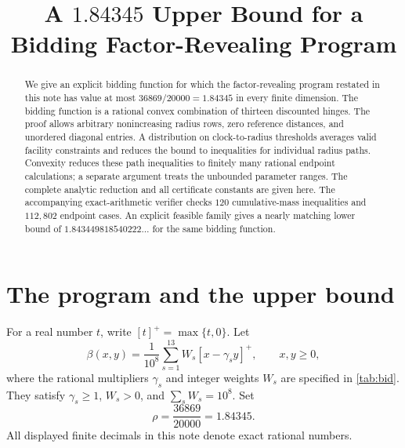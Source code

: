 \documentclass[11pt]{article}
\title{A $1.84345$ Upper Bound for a\\
Bidding Factor-Revealing Program}
\author{}
\date{}
\theoremstyle{definition}
\theoremstyle{remark}
\begin{document}
\maketitle
\vspace{-2.5em}

\begin{abstract}
We give an explicit bidding function for which the factor-revealing program
restated in this note has value at most $36869/20000=1.84345$ in every
finite dimension. The bidding function is a rational convex combination of
thirteen discounted hinges. The proof allows arbitrary nonincreasing
radius rows, zero reference distances, and unordered diagonal entries.
A distribution on clock-to-radius thresholds averages valid facility
constraints and reduces the bound to inequalities for individual radius
paths. Convexity reduces these path inequalities to finitely many rational
endpoint calculations; a separate argument treats the unbounded parameter
ranges. The complete analytic reduction and all certificate constants are
given here. The accompanying exact-arithmetic verifier checks $120$
cumulative-mass inequalities and $112{,}802$ endpoint cases. An explicit
feasible family gives a nearly matching lower bound of
$1.843449818540222\ldots$ for the same bidding function.
\end{abstract}

\section{The program and the upper bound}\label{sec:program}

For a real number $t$, write $[t]^+=\max\{t,0\}$. Let
\begin{equation}\label{eq:bid}
  \beta(x,y)=\frac1{10^8}\sum_{s=1}^{13}W_s[x-\gamma_s y]^+,
  \qquad x,y\ge0,
\end{equation}
where the rational multipliers $\gamma_s$ and integer weights $W_s$ are
specified in \cref{tab:bid}. They satisfy $\gamma_s\ge1$, $W_s>0$, and
$\sum_sW_s=10^8$. Set
\begin{equation}\label{eq:rho}
  \rho=\frac{36869}{20000}=1.84345.
\end{equation}
All displayed finite decimals in this note denote exact rational numbers.
\end{document}
